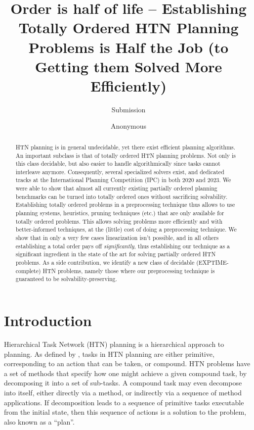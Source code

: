 \documentclass[letterpaper]{article} %
\author {
    Submission
}
\author {
    Anonymous

}
\title{Order is half of life -- Establishing Totally Ordered HTN
	Planning Problems is Half the Job (to Getting them Solved More Efficiently)}
\begin{document}

\maketitle

\begin{abstract} 
HTN planning is in general undecidable, yet there exist efficient
planning algorithms. An important subclass is that of totally ordered
HTN planning problems. Not only is this class decidable, but also easier
to handle algorithmically since tasks cannot interleave anymore.
Consequently, several specialized solvers exist, and dedicated tracks at
the International Planning Competition (IPC) in both 2020 and 2023. We
were able to show that almost all currently existing partially ordered
planning benchmarks can be turned into totally ordered ones without
sacrificing solvability. Establishing totally ordered problems in a
preprocessing technique thus allows to use planning systems, heuristics,
pruning techniques (etc.) that are only available for totally ordered
problems. This allows solving problems more efficiently and with
better-informed techniques, at the (little) cost of doing a
preprocessing technique. We show that in only a very few cases
linearization isn't possible, and in all others establishing a total
order pays off \emph{significantly}, thus establishing our technique as
a significant ingredient in the state of the art for solving partially
ordered HTN problems. As a side contribution, we identify a new class of
decidable (EXPTIME-complete) HTN problems, namely those where our
preprocessing technique is guaranteed to be solvability-preserving.
\end{abstract}
 
 

 
 
 
\section{Introduction}
% 
Hierarchical Task Network (HTN) planning is a hierarchical approach to planning. As defined by \cite{HTNSurvey},  %
tasks in HTN planning are either primitive, corresponding to an action that can be taken, or compound. HTN problems have a set of methods that specify how one might achieve a given compound task, by decomposing it into a set of sub-tasks. A compound task may even decompose into itself, either directly via a method, or indirectly via a sequence of method applications. If decomposition leads to a sequence of primitive tasks executable from the initial state, then this sequence of actions is a solution to the problem, also known as a \enquote{plan}. 
\end{document}
